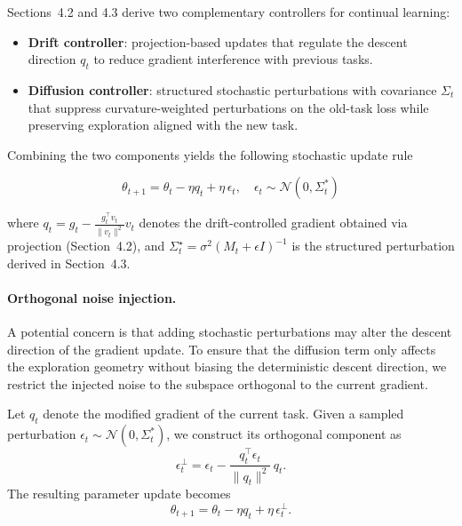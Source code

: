 \documentclass{article}
\begin{document}
Sections~4.2 and 4.3 derive two complementary controllers for continual learning:

\begin{itemize}
\item \textbf{Drift controller}: projection-based updates that regulate the descent direction $q_t$ to reduce gradient interference with previous tasks.
\item \textbf{Diffusion controller}: structured stochastic perturbations with covariance $\Sigma_t$ that suppress curvature-weighted perturbations on the old-task loss while preserving exploration aligned with the new task.
\end{itemize}

Combining the two components yields the following stochastic update rule

\begin{equation}
\theta_{t+1}
=
\theta_t
-
\eta q_t
+
{\eta}\,\epsilon_t , \quad \epsilon_t \sim \mathcal N(0,\Sigma^*_t)
\end{equation}

where $q_t
=
g_t
-
\frac{g_t^\top v_t}{\|v_t\|^2} v_t$ denotes the drift-controlled gradient obtained via projection (Section~4.2), and $\Sigma_t^\star
=
\sigma^2
\left(
M_t + \epsilon I
\right)^{-1}$
is the structured perturbation derived in Section~4.3.


\paragraph{Orthogonal noise injection.}

A potential concern is that adding stochastic perturbations may alter the descent direction of the gradient update.
To ensure that the diffusion term only affects the exploration geometry without biasing the deterministic descent direction, we restrict the injected noise to the subspace orthogonal to the current gradient.

Let $q_t$ denote the modified gradient of the current task.
Given a sampled perturbation $\epsilon_t \sim \mathcal N(0,\Sigma_t^*)$, we construct its orthogonal component as
\begin{equation}
\epsilon_t^\perp
=
\epsilon_t
-
\frac{q_t^\top \epsilon_t}{\|q_t\|^2}\, q_t .
\end{equation}
The resulting parameter update becomes
\begin{equation}
\theta_{t+1}
=
\theta_t
-
\eta q_t
+
{\eta}\,\epsilon_t^\perp .
\end{equation}
\end{document}
